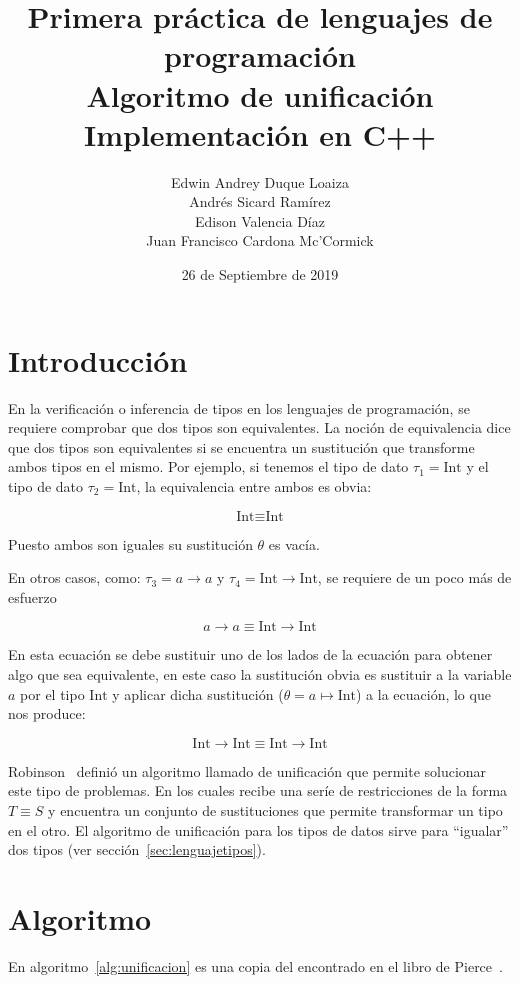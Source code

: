 \documentclass{article}
\title{Primera práctica de lenguajes de programación\\Algoritmo de unificación\\Implementación en C++}
\date{26 de Septiembre de 2019}
\author{Edwin Andrey Duque Loaiza\\Andrés Sicard Ramírez\\Edison Valencia Díaz\\Juan Francisco Cardona Mc'Cormick}
\begin{document}
\maketitle{}

\section{Introducción}
\label{sec:Introduccion}

En la verificación o inferencia de tipos en los lenguajes de
programación, se requiere comprobar que dos tipos son equivalentes. La
noción de equivalencia dice que dos tipos son equivalentes si se
encuentra un sustitución que transforme ambos tipos en el mismo. Por
ejemplo, si tenemos el tipo de dato $\tau_1 = \text{Int}$ y el tipo de
dato $\tau_2 = \text{Int}$, la equivalencia entre ambos es obvia:

\[
  \text{Int} \equiv \text{Int}
\]

Puesto ambos son iguales su sustitución $\theta$ es vacía.

En otros casos, como: $\tau_3 = a \to a$ y $\tau_4 = \text{Int}
\to \text{Int}$, se requiere de un poco más de esfuerzo

\[
  a \to a \equiv \text{Int} \to \text{Int}
\]

En esta ecuación se debe sustituir uno de los lados de la ecuación
para obtener algo que sea equivalente, en este caso la sustitución
obvia es sustituir a la variable $a$ por el tipo $\text{Int}$ y
aplicar dicha sustitución ($\theta = a \mapsto \text{Int}$) a la
ecuación, lo que nos produce:

\[
  \text{Int} \to \text{Int} \equiv \text{Int} \to \text{Int}
\]

Robinson~\cite{robinson} definió un algoritmo llamado de unificación
que permite solucionar este tipo de problemas. En los cuales recibe
una seríe de restricciones de la forma $T \equiv S$ y encuentra un
conjunto de sustituciones que permite transformar un tipo en el
otro. El algoritmo de unificación para los tipos de datos sirve para
``igualar'' dos tipos (ver sección~\ref{sec:lenguajetipos}).

\section{Algoritmo}\label{sec:algoritmo}

En algoritmo~\ref{alg:unificacion} es una copia del encontrado en el
libro de Pierce~\cite{pierce}.
\end{document}
